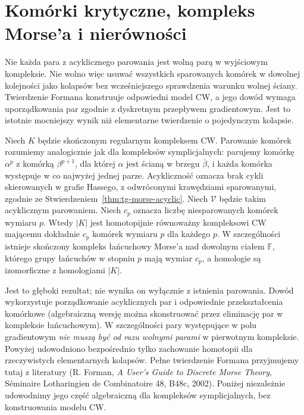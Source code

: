 \section{Komórki krytyczne, kompleks Morse'a i nierówności}
\label{sec:tg-forman-inequalities}

\begin{uwaga}
Nie każda para z acyklicznego parowania jest wolną parą
w wyjściowym kompleksie. Nie wolno więc usuwać wszystkich
sparowanych komórek w dowolnej kolejności jako kolapsów
bez wcześniejszego sprawdzenia warunku wolnej ściany.
Twierdzenie Formana konstruuje odpowiedni model CW,
a jego dowód wymaga uporządkowania par zgodnie z dyskretnym
przepływem gradientowym. Jest to istotnie mocniejszy wynik
niż elementarne twierdzenie o pojedynczym kolapsie.
\end{uwaga}

\begin{twierdzenie}
\label{thm:tg-forman-main}
Niech $K$ będzie skończonym regularnym kompleksem CW.
Parowanie komórek rozumiemy analogicznie jak dla kompleksów
symplicjalnych: parujemy komórkę $\alpha^p$ z komórką
$\beta^{p+1}$, dla której $\alpha$ jest ścianą
w brzegu $\overline\beta$, i każda komórka występuje
w co najwyżej jednej parze. Acykliczność oznacza brak
cykli skierowanych w grafie Hassego, z odwróconymi
krawędziami sparowanymi, zgodnie ze
Stwierdzeniem~\ref{thm:tg-morse-acyclic}.
Niech $\mathcal V$ będzie takim acyklicznym parowaniem.
Niech $c_p$ oznacza liczbę niesparowanych komórek
wymiaru $p$. Wtedy $|K|$ jest homotopijnie równoważny
kompleksowi CW mającemu dokładnie $c_p$ komórek
wymiaru $p$ dla każdego $p$.
W szczególności istnieje skończony kompleks łańcuchowy
Morse'a nad dowolnym ciałem $\mathbb F$, którego grupy łańcuchów
w stopniu $p$ mają wymiar $c_p$, a homologie są
izomorficzne z homologiami $|K|$.
\end{twierdzenie}

\begin{uwaga}
Jest to głęboki rezultat; nie wynika on wyłącznie z
istnienia parowania. Dowód wykorzystuje porządkowanie
acyklicznych par i odpowiednie przekształcenia komórkowe
(algebraiczną wersję można skonstruować przez eliminację
par w kompleksie łańcuchowym). W szczególności pary
występujące w polu gradientowym \emph{nie muszą być
od razu wolnymi parami} w pierwotnym kompleksie.
Powyżej udowodniono bezpośrednio tylko zachowanie
homotopii dla rzeczywistych elementarnych kolapsów.
Pełne twierdzenie Formana przyjmujemy tutaj z literatury
(R. Forman, \emph{A User's Guide to Discrete Morse Theory},
Séminaire Lotharingien de Combinatoire 48, B48c, 2002).
Poniżej niezależnie udowodnimy jego część algebraiczną
dla kompleksów symplicjalnych, bez konstruowania modelu CW.
\end{uwaga}

